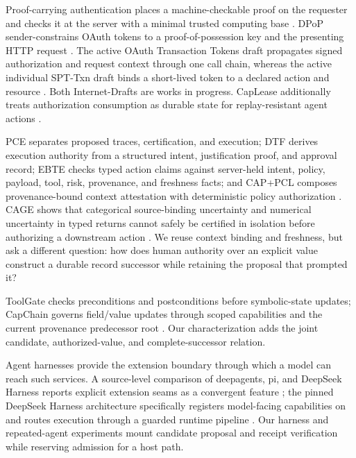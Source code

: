 Proof-carrying authentication places a machine-checkable proof on the requester and checks it at the server with a minimal trusted computing base \citep{appel1999pca}. DPoP sender-constrains OAuth tokens to a proof-of-possession key and the presenting HTTP request \citep{fett2023dpop}. The active OAuth Transaction Tokens draft propagates signed authorization and request context through one call chain, whereas the active individual SPT-Txn draft binds a short-lived token to a declared action and resource \citep{tulshibagwale2026txtokens,coetzee2026spttxn}. Both Internet-Drafts are works in progress. CapLease additionally treats authorization consumption as durable state for replay-resistant agent actions \citep{xu2026caplease}.

PCE separates proposed traces, certification, and execution; DTF derives execution authority from a structured intent, justification proof, and approval record; EBTE checks typed action claims against server-held intent, policy, payload, tool, risk, provenance, and freshness facts; and CAP+PCL composes provenance-bound context attestation with deterministic policy authorization \citep{liu2026pce,he2026dtf,zhu2026ebte,chitan2026cappcl}. CAGE shows that categorical source-binding uncertainty and numerical uncertainty in typed returns cannot safely be certified in isolation before authorizing a downstream action \citep{delattre2026cage}. We reuse context binding and freshness, but ask a different question: how does human authority over an explicit value construct a durable record successor while retaining the proposal that prompted it?

ToolGate checks preconditions and postconditions before symbolic-state updates; CapChain governs field/value updates through scoped capabilities and the current provenance predecessor root \citep{liu2026toolgate,choong2026capchain}. Our characterization adds the joint candidate, authorized-value, and complete-successor relation.

Agent harnesses provide the extension boundary through which a model can reach such services. A source-level comparison of deepagents, pi, and DeepSeek Harness reports explicit extension seams as a convergent feature \citep{dai2026harnesses}; the pinned DeepSeek Harness architecture specifically registers model-facing capabilities on  and routes execution through a guarded runtime pipeline \citep{deepseek2026architecture}. Our harness and repeated-agent experiments mount candidate proposal and receipt verification while reserving admission for a host path.

